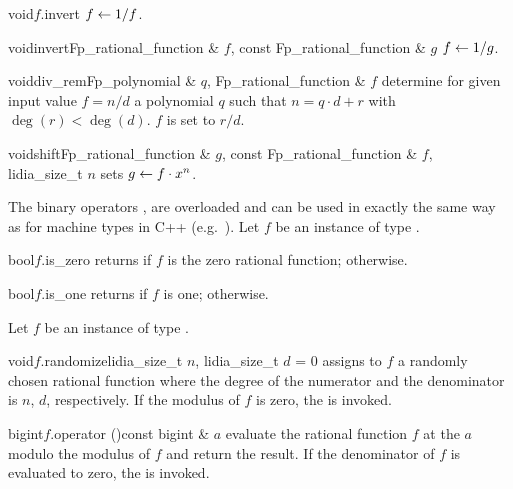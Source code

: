\begin{fcode}{void}{$f$.invert}{}
  $f \leftarrow 1 / f$.
\end{fcode}

\begin{fcode}{void}{invert}{Fp_rational_function & $f$, const Fp_rational_function & $g$}
  $f \leftarrow 1 / g$.
\end{fcode}

\begin{fcode}{void}{div_rem}{Fp_polynomial & $q$, Fp_rational_function & $f$}
  determine for given input value $f = n / d$ a polynomial $q$ such that $n = q \cdot d + r$ with
  $\deg(r) < \deg (d)$.  $f$ is set to $r / d$.
\end{fcode}

\begin{fcode}{void}{shift}{Fp_rational_function & $g$, const Fp_rational_function & $f$,
    lidia_size_t $n$}%
  sets $g \leftarrow f \cdot x^n$.
\end{fcode}



\COMP

The binary operators \code{==}, \code{!=} are overloaded and can be used in exactly the same way
as for machine types in C++ (e.g.~).  Let $f$ be an instance of type
.

\begin{cfcode}{bool}{$f$.is_zero}{}
  returns \TRUE if $f$ is the zero rational function; \FALSE otherwise.
\end{cfcode}

\begin{cfcode}{bool}{$f$.is_one}{}
  returns \TRUE if $f$ is one; \FALSE otherwise.
\end{cfcode}



\HIGH

Let $f$ be an instance of type .

\begin{fcode}{void}{$f$.randomize}{lidia_size_t $n$, lidia_size_t $d$ = 0}
  assigns to $f$ a randomly chosen rational function where the degree of the numerator and the
  denominator is $n$, $d$, respectively.  If the modulus of $f$ is zero, the \LEH is invoked.
\end{fcode}

\begin{cfcode}{bigint}{$f$.operator ()}{const bigint & $a$}
  evaluate the rational function $f$ at the  $a$ modulo the modulus of $f$ and
  return the result.  If the denominator of $f$ is evaluated to zero, the \LEH is invoked.
\end{cfcode}

